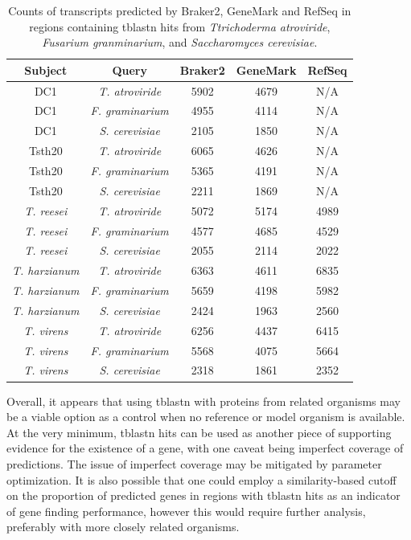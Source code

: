 \begin{table}
  \centering
  \begin{tabular}{|c|c|c|c|c|}
    \hline
    Subject & Query & Braker2 & GeneMark & RefSeq \\ \hline
    DC1 & \textit{T. atroviride} & 5902 & 4679 & N/A \\ \hline
    DC1 & \textit{F. graminarium} & 4955 & 4114 & N/A \\ \hline
    DC1 & \textit{S. cerevisiae} & 2105 & 1850 & N/A \\ \hline
    Tsth20 & \textit{T. atroviride} & 6065 & 4626 & N/A \\ \hline
    Tsth20 & \textit{F. graminarium} & 5365 & 4191 & N/A \\ \hline
    Tsth20 & \textit{S. cerevisiae} & 2211 & 1869 & N/A \\ \hline
    \textit{T. reesei} & \textit{T. atroviride} & 5072 & 5174 & 4989 \\ \hline
    \textit{T. reesei} & \textit{F. graminarium} & 4577 & 4685 & 4529 \\ \hline
    \textit{T. reesei} & \textit{S. cerevisiae} & 2055 & 2114 & 2022 \\ \hline
    \textit{T. harzianum} & \textit{T. atroviride} & 6363 & 4611 & 6835 \\ \hline
    \textit{T. harzianum} & \textit{F. graminarium} & 5659 & 4198 & 5982 \\ \hline
    \textit{T. harzianum} & \textit{S. cerevisiae} & 2424 & 1963 & 2560 \\ \hline
    \textit{T. virens} & \textit{T. atroviride} & 6256 & 4437 & 6415 \\ \hline
    \textit{T. virens} & \textit{F. graminarium} & 5568 & 4075 & 5664 \\ \hline
    \textit{T. virens} & \textit{S. cerevisiae} & 2318 & 1861 & 2352 \\ \hline
  \end{tabular}
  \caption{Counts of transcripts predicted by Braker2, GeneMark and
    RefSeq in regions containing tblastn hits from
    \textit{Ttrichoderma atroviride}, \textit{Fusarium granminarium},
    and \textit{Saccharomyces cerevisiae}.}
  \label{table:tblastn-genes}
\end{table}

Overall, it appears that using tblastn with proteins from related
organisms may be a viable option as a control when no reference or
model organism is available. At the very minimum, tblastn hits can be
used as another piece of supporting evidence for the existence of a
gene, with one caveat being imperfect coverage of predictions. The
issue of imperfect coverage may be mitigated by parameter
optimization. It is also possible that one could employ a
similarity-based cutoff on the proportion of predicted genes in
regions with tblastn hits as an indicator of gene finding performance,
however this would require further analysis, preferably with more
closely related organisms.
